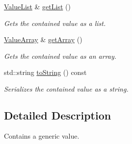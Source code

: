 \begin{DoxyCompactItemize}
\mbox{\hyperlink{classZiApi_1_1FieldValue_a80ee7fc5fc9c95e80ef61929b277c5e5}{Value\+List}} \& \mbox{\hyperlink{classZiApi_1_1FieldValue_a4d0a72887b483f6fe4d314b84dd7c09c}{get\+List}} ()
\begin{DoxyCompactList}\small\item\em Gets the contained value as a list. \end{DoxyCompactList}\item 
\mbox{\label{classZiApi_1_1FieldValue_a52df6ed05138b911d3f79ae46775265f}} 
\mbox{\hyperlink{classZiApi_1_1FieldValue_a879443efd90b1669535916854847a239}{Value\+Array}} \& \mbox{\hyperlink{classZiApi_1_1FieldValue_a52df6ed05138b911d3f79ae46775265f}{get\+Array}} ()
\begin{DoxyCompactList}\small\item\em Gets the contained value as an array. \end{DoxyCompactList}\item 
\mbox{\label{classZiApi_1_1FieldValue_a704771df964e4cc9232c78af6c3bc928}} 
std\+::string \mbox{\hyperlink{classZiApi_1_1FieldValue_a704771df964e4cc9232c78af6c3bc928}{to\+String}} () const
\begin{DoxyCompactList}\small\item\em Serializes the contained value as a string. \end{DoxyCompactList}\end{DoxyCompactItemize}


\subsection{Detailed Description}
Contains a generic value. 


